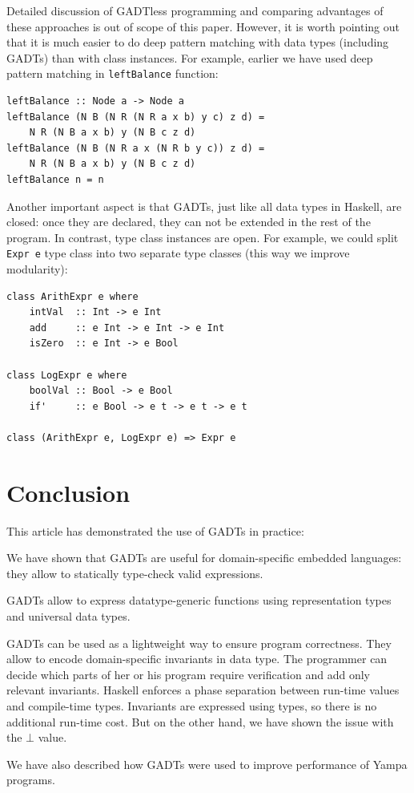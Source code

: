 \documentclass{tmr}
\begin{document}
Detailed discussion of GADTless programming and comparing advantages of these approaches is out of scope of this paper. However, it is worth pointing out that it is much easier to do deep pattern matching with data types (including GADTs) than with class instances. For example, earlier we have used deep pattern matching in \verb|leftBalance| function:

\begin{Verbatim}
leftBalance :: Node a -> Node a
leftBalance (N B (N R (N R a x b) y c) z d) =
    N R (N B a x b) y (N B c z d)
leftBalance (N B (N R a x (N R b y c)) z d) =
    N R (N B a x b) y (N B c z d)
leftBalance n = n
\end{Verbatim}

Another important aspect is that GADTs, just like all data types in Haskell, are closed: once they are declared, they can not be extended in the rest of the program. In contrast, type class instances are open. For example, we could split \verb|Expr e| type class into two separate type classes (this way we improve modularity):

\begin{Verbatim}
class ArithExpr e where
    intVal  :: Int -> e Int
    add     :: e Int -> e Int -> e Int
    isZero  :: e Int -> e Bool

class LogExpr e where
    boolVal :: Bool -> e Bool
    if'     :: e Bool -> e t -> e t -> e t
    
class (ArithExpr e, LogExpr e) => Expr e
\end{Verbatim}

\section{Conclusion}
\label{sec:conclusion}

This article has demonstrated the use of GADTs in practice:

\begin{longitem}
\item We have shown that GADTs are useful for domain-specific embedded languages: they allow to statically type-check valid expressions.
\item GADTs allow to express datatype-generic functions using representation types and universal data types.
\item GADTs can be used as a lightweight way to ensure program correctness. They allow to encode domain-specific invariants in data type. The programmer can decide which parts of her or his program require verification and add only relevant invariants. Haskell enforces a phase separation between run-time values and compile-time types. Invariants are expressed using types, so there is no additional run-time cost. But on the other hand, we have shown the issue with the $\bot$ value.
\item We have also described how GADTs were used to improve performance of Yampa programs.
\end{longitem}
\end{document}
